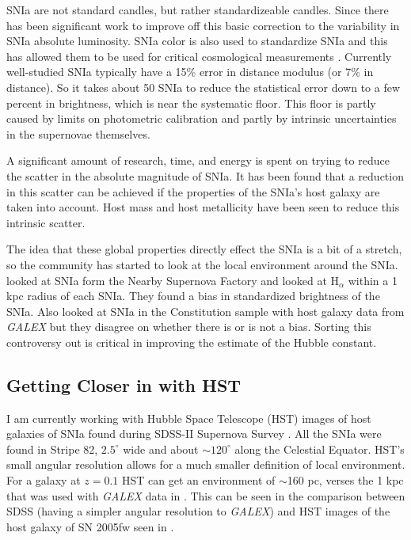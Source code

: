 \documentclass[apj, iop]{emulateapj}
\newcommand{\sn}{SNIa}
\newcommand{\todo}[1]{\textbf{\textcolor{red}{#1}}}
\newcommand{\Hubble}{\ensuremath{\text{H}_0}}
\begin{document}
\sn{} are not standard candles, but rather standardizeable candles. Since
\cite{Phillips93} there has been significant work to improve off this basic
correction to the variability in \sn{} absolute luminosity. \sn{} color is also
used to standardize \sn{} and this has allowed them to be used for critical
cosmological measurements \citep{Riess98, Perlmutter99}. Currently well-studied
\sn{} typically have a 15\% error in distance modulus (or 7\% in
distance). So it takes about 50 \sn{} to reduce the statistical error down to a
few percent in brightness, which is near the systematic floor. This floor
is partly caused by limits on photometric calibration and partly by intrinsic
uncertainties in the supernovae themselves.

A significant amount of research, time, and energy is spent on trying to reduce
the scatter in the absolute magnitude of \sn{}. It has been found that a
reduction in this scatter can be achieved if the properties of the \sn{}'s host
galaxy are taken into account. Host mass \citep{Childress13} and host
metallicity \citep{Hayden13} have been seen to reduce this intrinsic scatter.

The idea that these global properties directly effect the \sn{} is a bit of a
stretch, so the community has started to look at the local environment around
the \sn{}. \cite{Rigault13} looked at \sn{} form the Nearby Supernova Factory
and looked at H$_{\alpha}$ within a 1 kpc radius of each \sn{}. They found a
bias in standardized brightness of the \sn{}. Also \cite{Rigault15, Jones15}
looked at \sn{} in the Constitution sample with host galaxy data from {\it
GALEX} but they disagree on whether there is or is not a bias. %
Sorting this controversy out is
critical in improving the estimate of the Hubble constant.

\subsection{Getting Closer in with HST}\label{hst}

I am currently working with Hubble Space Telescope (HST) images of host galaxies
of \sn{} found during SDSS-II Supernova Survey
\citep{2008AJ....135..338F,2008AJ....135..348S}. All the \sn{} were found in
Stripe 82, $2.5^{\circ}$ wide and about $\sim120^{\circ}$ along the Celestial
Equator. HST's small angular resolution allows for a much smaller definition of
local environment. For a galaxy at $z = 0.1$ HST can get an environment of
$\sim$160 pc, verses the 1 kpc that was used with {\it GALEX} data in
\cite{Jones15,Rigault15}. This can be seen in the comparison between SDSS
(having a simpler angular resolution to {\it GALEX}) and HST images of the host
galaxy of SN 2005fw seen in .
\end{document}
